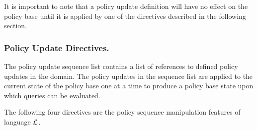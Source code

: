\documentclass[11pt]{llncs}
\begin{document}
        It is important to note that a policy update definition will have no
        effect on the policy base until it is applied by one of the
        directives described in the following section.

      \subsubsection{Policy Update Directives.}

        The policy update sequence list contains a list of references to
        defined policy updates in the domain. The policy updates in the
        sequence list are applied to the current state of the policy base one
        at a time to produce a policy base state upon which queries can be
        evaluated.

        The following four directives are the policy sequence manipulation
        features of language $\cal{L}$.
\end{document}

